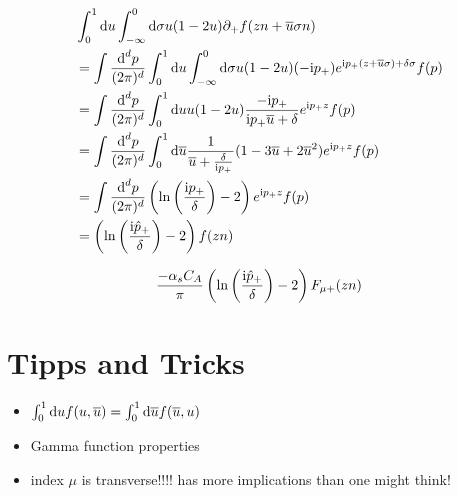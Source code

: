 \begin{align}
	&\int_0^1 \text{d} u \int _{-\infty}^0 \text{d} \sigma u (1-2u) \partial_+ f(zn+\overline u \sigma n)
	\\
	&=
	\int \frac{\text{d} ^d p}{(2\pi)^d}  \int_0^1 \text{d} u \int _{-\infty}^0 \text{d} \sigma u (1-2u) (-\text{i} p_{+}) e^{\text{i} p_{+}(z+\overline u \sigma ) + \delta \sigma} f(p)
	\\
	&=
	\int \frac{\text{d} ^d p}{(2\pi)^d}  \int_0^1 \text{d} u  u (1-2u)  \frac{-\text{i} p_{+}}{\text{i} p_{+} \overline u + \delta} e^{\text{i} p_{+} z} f(p)
	\\
	&=
	\int \frac{\text{d} ^d p}{(2\pi)^d}  \int_0^1 \text{d} \overline u   \frac{1}{\overline u + \frac{\delta}{\text{i} p_{+}}}(1-3\overline u +2\overline u^2) e^{\text{i} p_{+} z} f(p)
	\\
	&=
	\int \frac{\text{d} ^d p}{(2\pi)^d}  \left(\ln\left(\frac{\text{i} p_{+}}{\delta}\right)-2\right) e^{\text{i} p_{+} z} f(p)
	\\
	&=
	\left(\ln\left(\frac{\text{i} \hat p_{+}}{\delta}\right)-2\right) f(zn)
\end{align}

\begin{align}
	\frac{-\alpha_s C_A}{\pi}\left(\ln\left(\frac{\text{i} \hat p_{+}}{\delta}\right)-2\right) F_{\mu +}(zn)
\end{align}
\section{Tipps and Tricks}
\begin{itemize}
	\item $\int _0^1 \text{d} u  f(u,\overline u) = \int _0^1 \text{d} \overline u  f(\overline u, u)$
	\item Gamma function properties
	\item index $\mu$ is transverse!!!! has more implications than one might think!
\end{itemize}

